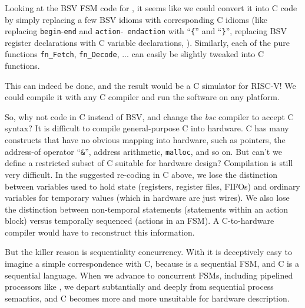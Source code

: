 Looking at the BSV FSM code for {\DRUM}, it seems like we could convert
it into C code by simply replacing a few BSV idioms with corresponding
C idioms (like replacing {\tt begin}-{\tt end} and {\tt action}-{\tt
endaction} with ``{\tt \{}'' and ``{\tt \}}'', replacing BSV register
declarations with C variable declarations, {\etc}).  Similarly, each
of the pure functions {\tt fn\_Fetch}, {\tt fn\_Decode}, ...  can
easily be slightly tweaked into C functions.

This can indeed be done, and the result would be a C simulator for
RISC-V!  We could compile it with any C compiler and run the software
on any platform.

So, why not code {\DRUM} in C instead of BSV, and change the \emph{bsc}
compiler to accept C syntax?  It is difficult to compile
general-purpose C into hardware.  C has many constructs that have no
obvious mapping into hardware, such as pointers, the address-of
operator ``\verb|&|'', address arithmetic, \verb|malloc|, and so on.
But can't we define a restricted subset of C suitable for hardware
design?  Compilation is still very difficult.  In the suggested
re-coding in C above, we lose the distinction between variables used
to hold state (registers, register files, FIFOs) and ordinary
variables for temporary values (which in hardware are just wires).  We
also lose the distinction between non-temporal statements (statements
within an action block) versus temporally sequenced (actions in an
FSM).  A C-to-hardware compiler would have to reconstruct this
information.

But the killer reason is sequentiality {\vs} concurrency.  With {\DRUM}
it is deceptively easy to imagine a simple correspondence with C,
because {\DRUM} is a sequential FSM, and C is a sequential language.
When we advance to concurrent FSMs, including pipelined processors
like {\FIFE}, we depart subtantially and deeply from sequential process
semantics, and C becomes more and more unsuitable for hardware
description.

\vspace{2ex}

